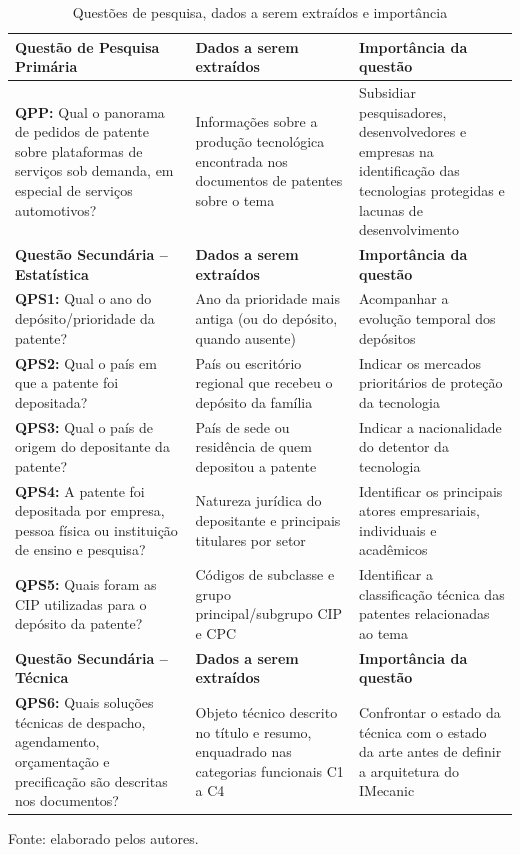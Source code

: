 \documentclass[12pt,a4paper]{article}
\begin{document}
\begin{table}[htbp]
\centering\small
\caption{Questões de pesquisa, dados a serem extraídos e importância}\label{tab:qp}
\begin{tabular}{p{4.3cm}p{4.2cm}p{4.7cm}}
\toprule
\textbf{Questão de Pesquisa Primária} & \textbf{Dados a serem extraídos} & \textbf{Importância da questão}\\
\midrule
\textbf{QPP:} Qual o panorama de pedidos de patente sobre plataformas de serviços sob demanda, em especial de serviços automotivos? & Informações sobre a produção tecnológica encontrada nos documentos de patentes sobre o tema & Subsidiar pesquisadores, desenvolvedores e empresas na identificação das tecnologias protegidas e lacunas de desenvolvimento\\
\midrule
\textbf{Questão Secundária -- Estatística} & \textbf{Dados a serem extraídos} & \textbf{Importância da questão}\\
\midrule
\textbf{QPS1:} Qual o ano do depósito/prioridade da patente? & Ano da prioridade mais antiga (ou do depósito, quando ausente) & Acompanhar a evolução temporal dos depósitos\\
\textbf{QPS2:} Qual o país em que a patente foi depositada? & País ou escritório regional que recebeu o depósito da família & Indicar os mercados prioritários de proteção da tecnologia\\
\textbf{QPS3:} Qual o país de origem do depositante da patente? & País de sede ou residência de quem depositou a patente & Indicar a nacionalidade do detentor da tecnologia\\
\textbf{QPS4:} A patente foi depositada por empresa, pessoa física ou instituição de ensino e pesquisa? & Natureza jurídica do depositante e principais titulares por setor & Identificar os principais atores empresariais, individuais e acadêmicos\\
\textbf{QPS5:} Quais foram as CIP utilizadas para o depósito da patente? & Códigos de subclasse e grupo principal/subgrupo CIP e CPC & Identificar a classificação técnica das patentes relacionadas ao tema\\
\midrule
\textbf{Questão Secundária -- Técnica} & \textbf{Dados a serem extraídos} & \textbf{Importância da questão}\\
\midrule
\textbf{QPS6:} Quais soluções técnicas de despacho, agendamento, orçamentação e precificação são descritas nos documentos? & Objeto técnico descrito no título e resumo, enquadrado nas categorias funcionais C1 a C4 & Confrontar o estado da técnica com o estado da arte antes de definir a arquitetura do IMecanic\\
\bottomrule
\end{tabular}

\smallskip
\footnotesize Fonte: elaborado pelos autores.
\end{table}
\end{document}

